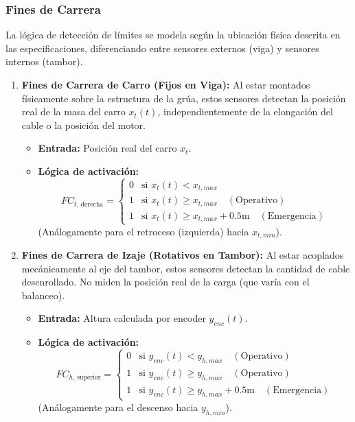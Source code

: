 \documentclass[11pt]{article}                                    %
\begin{document}
\subsubsection{Fines de Carrera}
La lógica de detección de límites se modela según la ubicación física descrita en las especificaciones, diferenciando entre sensores externos (viga) y sensores internos (tambor).
\begin{enumerate}
    \item \textbf{Fines de Carrera de Carro (Fijos en Viga):} Al estar montados físicamente sobre la estructura de la grúa, estos sensores detectan la posición real de la masa del carro $x_t(t)$, independientemente de la elongación del cable o la posición del motor.
    \begin{itemize}
        \item \textbf{Entrada:} Posición real del carro $x_t$.
        \item \textbf{Lógica de activación:}
        \begin{equation}
            FC_{t,\,\text{derecha}} = 
            \begin{cases} 
                0 & \text{si } x_t(t) < x_{t,max}  \\
                1 & \text{si } x_t(t) \ge x_{t,max} \quad (\text{Operativo}) \\
                1 & \text{si } x_t(t) \ge x_{t,max} + 0.5 \text{m} \quad (\text{Emergencia})
            \end{cases}
        \end{equation}
        (Análogamente para el retroceso (izquierda) hacia $x_{t,min}$).
    \end{itemize}
    \item \textbf{Fines de Carrera de Izaje (Rotativos en Tambor):} Al estar acoplados mecánicamente al eje del tambor, estos sensores detectan la cantidad de cable desenrollado. No miden la posición real de la carga (que varía con el balanceo).
    \begin{itemize}
        \item \textbf{Entrada:} Altura calculada por encoder $y_{enc}(t)$.
        \item \textbf{Lógica de activación:}
        \begin{equation}
            FC_{h,\,\text{superior}} = 
            \begin{cases}
                0 & \text{si } y_{enc}(t) < y_{h,max} \quad (\text{Operativo}) \\
                1 & \text{si } y_{enc}(t) \ge y_{h,max} \quad (\text{Operativo}) \\
                1 & \text{si } y_{enc}(t) \ge y_{h,max} + 0.5 \text{m} \quad (\text{Emergencia})
            \end{cases}
        \end{equation}
        (Análogamente para el descenso hacia $y_{h,min}$).
    \end{itemize}
\end{enumerate}
\end{document}
